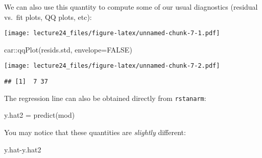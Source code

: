 \documentclass[
]{article}
\newenvironment{Shaded}{\begin{snugshade}}{\end{snugshade}}
\newcommand{\AttributeTok}[1]{\textcolor[rgb]{0.77,0.63,0.00}{#1}}
\newcommand{\ConstantTok}[1]{\textcolor[rgb]{0.00,0.00,0.00}{#1}}
\newcommand{\FunctionTok}[1]{\textcolor[rgb]{0.00,0.00,0.00}{#1}}
\newcommand{\NormalTok}[1]{#1}
\newcommand{\OtherTok}[1]{\textcolor[rgb]{0.56,0.35,0.01}{#1}}
\newcommand{\SpecialCharTok}[1]{\textcolor[rgb]{0.00,0.00,0.00}{#1}}
\begin{document}
We can also use this quantity to compute some of our usual diagnostics
(residual vs.~fit plots, QQ plots, etc):

\begin{Shaded}
\end{Shaded}

\texttt{[image: lecture24\_files/figure-latex/unnamed-chunk-7-1.pdf]}

\begin{Shaded}
\begin{Highlighting}[]
\NormalTok{car}\SpecialCharTok{::}\FunctionTok{qqPlot}\NormalTok{(resids.std, }\AttributeTok{envelope=}\ConstantTok{FALSE}\NormalTok{)}
\end{Highlighting}
\end{Shaded}

\texttt{[image: lecture24\_files/figure-latex/unnamed-chunk-7-2.pdf]}

\begin{verbatim}
## [1]  7 37
\end{verbatim}

The regression line can also be obtained directly from
\texttt{rstanarm}:

\begin{Shaded}
\begin{Highlighting}[]
\NormalTok{y.hat2 }\OtherTok{=} \FunctionTok{predict}\NormalTok{(mod)}
\end{Highlighting}
\end{Shaded}

You may notice that these quantities are \emph{slightly} different:

\begin{Shaded}
\begin{Highlighting}[]
\NormalTok{y.hat}\SpecialCharTok{{-}}\NormalTok{y.hat2}
\end{Highlighting}
\end{Shaded}
\end{document}
